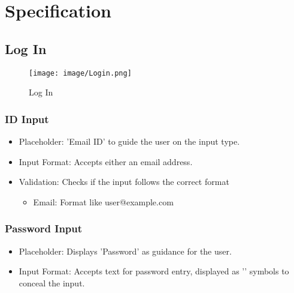 \documentclass[conference]{IEEEtran}
\begin{document}
\clearpage

\section{Specification}

\subsection{Log In}

\begin{figure}[h!]
    \centering
    \texttt{[image: image/Login.png]}
    \caption{Log In}
    \label{fig:enter-label}
\end{figure}

\subsubsection{ID Input}
\begin{itemize}
    \item Placeholder: 'Email ID' to guide the user on the input type.\\
    \item Input Format: Accepts either an email address.\\
    \item Validation: Checks if the input follows the correct format
\begin{itemize}
    \item Email: Format like user@example.com\\
\end{itemize}
\end{itemize}

\subsubsection{Password Input}
\begin{itemize}
    \item Placeholder: Displays 'Password' as guidance for the user.\\
    \item Input Format: Accepts text for password entry, displayed as '\textbullet' symbols to conceal the input.\\
\end{itemize}
\end{document}
